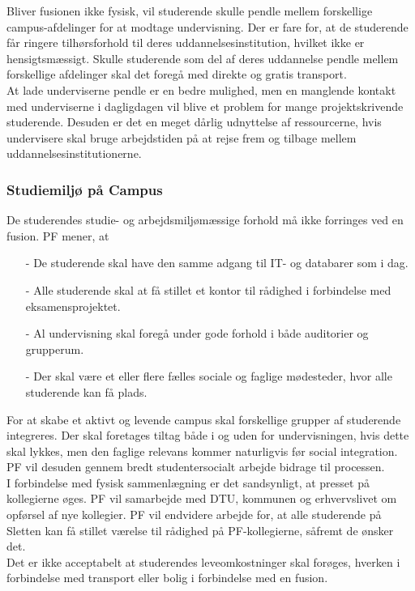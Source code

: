 Bliver fusionen ikke fysisk, vil studerende skulle pendle mellem forskellige campus-afdelinger for at modtage undervisning. Der er fare for, at de studerende får ringere tilhørsforhold til deres uddannelsesinstitution, hvilket ikke er hensigtsmæssigt. Skulle studerende som del af deres uddannelse pendle mellem forskellige afdelinger skal det foregå med direkte og gratis transport.\\

At lade underviserne pendle er en bedre mulighed, men en manglende kontakt med underviserne i dagligdagen vil blive et problem for mange projektskrivende studerende. Desuden er det en meget dårlig udnyttelse af ressourcerne, hvis undervisere skal bruge arbejdstiden på at rejse frem og tilbage mellem uddannelsesinstitutionerne.

\subsubsection{Studiemiljø på Campus}
De studerendes studie- og arbejdsmiljømæssige forhold må ikke forringes ved en fusion.
PF mener, at
\begin{itemize}
\item[-] De studerende skal have den samme adgang til IT- og databarer som i dag.
\item[-] Alle studerende skal at få stillet et kontor til rådighed i forbindelse med eksamensprojektet.
\item[-] Al undervisning skal foregå under gode forhold i både auditorier og grupperum.
\item[-] Der skal være et eller flere fælles sociale og faglige mødesteder, hvor alle studerende kan få plads.
\end{itemize}

For at skabe et aktivt og levende campus skal forskellige grupper af studerende integreres. Der skal foretages tiltag både i og uden for undervisningen, hvis dette skal lykkes, men den faglige relevans kommer naturligvis før social integration. PF vil desuden gennem bredt studentersocialt arbejde bidrage til processen.\\

I forbindelse med fysisk sammenlægning er det sandsynligt, at presset på kollegierne øges. PF vil samarbejde med DTU, kommunen og erhvervslivet om opførsel af nye kollegier. PF vil endvidere arbejde for, at alle studerende på Sletten kan få stillet værelse til rådighed på PF-kollegierne, såfremt de ønsker det.\\

Det er ikke acceptabelt at studerendes leveomkostninger skal forøges, hverken i forbindelse med transport eller bolig i
forbindelse med en fusion.